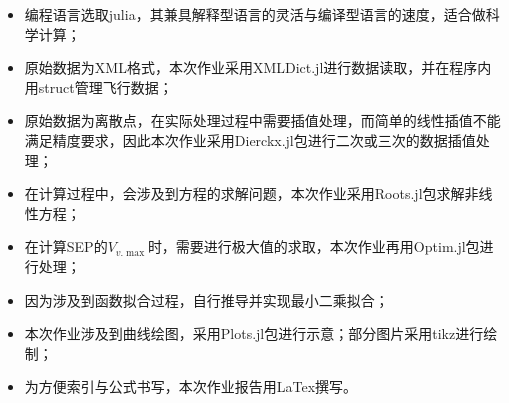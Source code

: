 \begin{itemize}
    \item 编程语言选取julia，其兼具解释型语言的灵活与编译型语言的速度，适合做科学计算；
    \item 原始数据为XML格式，本次作业采用XMLDict.jl进行数据读取，并在程序内用struct管理飞行数据；
    \item 原始数据为离散点，在实际处理过程中需要插值处理，而简单的线性插值不能满足精度要求，因此本次作业采用Dierckx.jl包进行二次或三次的数据插值处理；
    \item 在计算过程中，会涉及到方程的求解问题，本次作业采用Roots.jl包求解非线性方程；
    \item 在计算SEP的$V_{v.\max}$时，需要进行极大值的求取，本次作业再用Optim.jl包进行处理；
    \item 因为涉及到函数拟合过程，自行推导并实现最小二乘拟合；
    \item 本次作业涉及到曲线绘图，采用Plots.jl包进行示意；部分图片采用tikz进行绘制；
    \item 为方便索引与公式书写，本次作业报告用LaTex撰写。
\end{itemize}